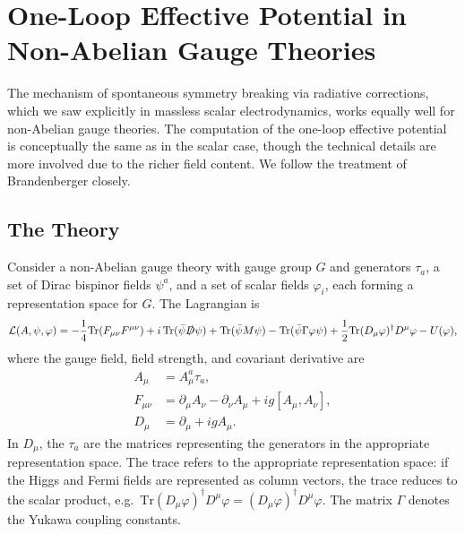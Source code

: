 \chapter{One-Loop Effective Potential in Non-Abelian Gauge Theories}
\label{ch:non-abelian-one-loop}

The mechanism of spontaneous symmetry breaking via radiative corrections,
which we saw explicitly in massless scalar electrodynamics, works equally
well for non-Abelian gauge theories. The computation of the one-loop
effective potential is conceptually the same as in the scalar case,
though the technical details are more involved due to the richer field
content. We follow the treatment of Brandenberger closely.

\section{The Theory}

Consider a non-Abelian gauge theory with gauge group $G$ and generators
$\tau_a$, a set of Dirac bispinor fields $\psi^a$, and a set of scalar
fields $\varphi_i$, each forming a representation space for $G$. The
Lagrangian is
\begin{equation}
    \mathcal{L}(A,\psi,\varphi) = -\frac{1}{4}\mathrm{Tr}(F_{\mu\nu}F^{\mu\nu})
    + i\,\mathrm{Tr}(\bar\psi\slashed{D}\psi)
    + \mathrm{Tr}(\bar\psi M\psi)
    - \mathrm{Tr}(\bar\psi\Gamma\varphi\psi)
    + \frac{1}{2}\mathrm{Tr}(D_\mu\varphi)^\dagger D^\mu\varphi
    - U(\varphi),
    \label{eq:non-abelian-lagrangian}
\end{equation}
where the gauge field, field strength, and covariant derivative are
\begin{align}
    A_\mu &= A_\mu^a\tau_a, \\
    F_{\mu\nu} &= \partial_\mu A_\nu - \partial_\nu A_\mu
    + ig[A_\mu, A_\nu], \\
    D_\mu &= \partial_\mu + igA_\mu.
\end{align}
In $D_\mu$, the $\tau_a$ are the matrices representing the generators
in the appropriate representation space. The trace refers to the
appropriate representation space: if the Higgs and Fermi fields are
represented as column vectors, the trace reduces to the scalar product,
e.g.\ $\mathrm{Tr}(D_\mu\varphi)^\dagger D^\mu\varphi
= (D_\mu\varphi)^\dagger D^\mu\varphi$. The matrix $\Gamma$ denotes the
Yukawa coupling constants.


